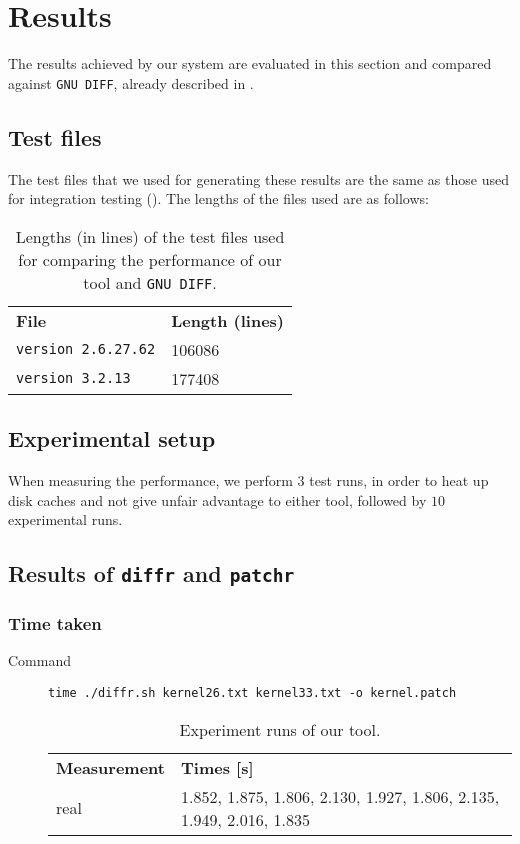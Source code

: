 \section{Results}

The results achieved by our system are evaluated in this section and compared against \texttt{GNU DIFF}, already described in . 

\subsection{Test files}
The test files that we used for generating these results are the same as those used for integration testing (). The lengths of the files used are as follows: 

\begin{table}[htbp]
\begin{center}
\begin{tabular}{ l l }
\textbf{File} & \textbf{Length (lines)} \\
\cmidrule(r){1-2}
\texttt{version 2.6.27.62} & 106086 \\
\texttt{version 3.2.13}    & 177408 \\
\end{tabular}
\end{center}
\caption{Lengths (in lines) of the test files used for comparing the performance of our tool and \texttt{GNU DIFF}.}
\end{table}

\subsection{Experimental setup} 
When measuring the performance, we perform $3$ test runs, in order to heat up disk caches and not give unfair advantage to either tool, followed by $10$ experimental runs.

\subsection{Results of \texttt{diffr} and \texttt{patchr}}

\subsubsection*{Time taken}
\begin{description}
\item[Command] \texttt{time ./diffr.sh kernel26.txt kernel33.txt -o kernel.patch}
\begin{table}[htbp]
\begin{center}
\begin{tabular}{ l p{3in} }
\textbf{Measurement} & \textbf{Times [s]} \\
\cmidrule(r){1-2}
real & 1.852, 1.875, 1.806, 2.130, 1.927, 1.806, 2.135, 1.949, 2.016, 1.835 \\
\end{tabular}
\end{center}
\caption{Experiment runs of our tool.}
\end{table}

\end{description}

